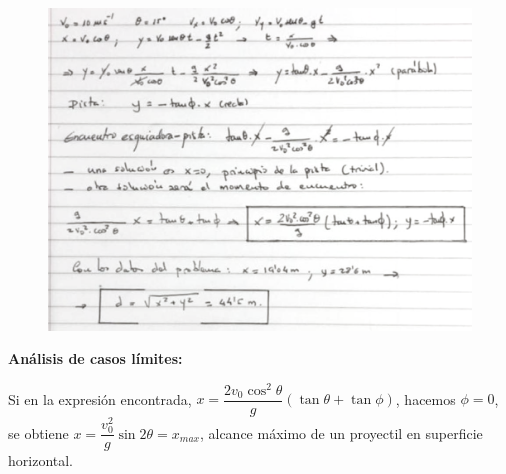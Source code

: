 \vspace{-3mm}\begin{figure}[H]
		\centering
		\includegraphics[width=1\textwidth]{imagenes/imagenes02/T02IM40.png}
		\end{figure}
		
	
		
\vspace{-3mm}\textbf{Análisis de casos límites:} 

Si en la expresión encontrada, $x=\dfrac{2v_0 \cos^2 \theta}{g}(\tan \theta+\tan \phi)$, hacemos $\phi=0$, se obtiene $x=\dfrac{v_0^2}{g} \sin 2\theta=x_{max}$, alcance máximo de un proyectil en superficie horizontal.

\newpage %

